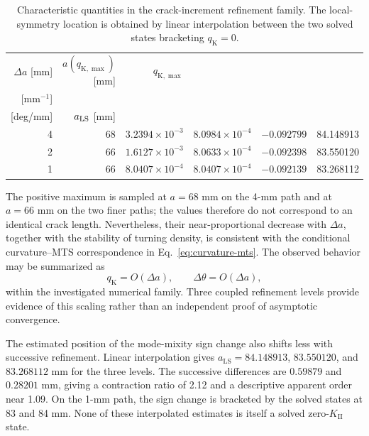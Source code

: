 \documentclass[pdflatex,sn-mathphys-num]{sn-jnl}
\begin{document}
\begin{table}[tbp]
\centering
\small
\setlength{\tabcolsep}{3.6pt}
\caption{Characteristic quantities in the crack-increment refinement
family. The local-symmetry location is obtained by linear interpolation
between the two solved states bracketing $q_{\mathrm{K}}=0$.}
\label{tab:increment-characteristic}
\begin{tabular}{rrrrrr}
\toprule
$\Delta a$ [mm] &
$a(q_{\mathrm{K},\max})$ [mm] &
$q_{\mathrm{K},\max}$ &
\shortstack[c]{$q_{\mathrm{K},\max}/\Delta a$\\{}[mm$^{-1}$]} &
\shortstack[c]{$(\Delta\theta/\Delta a)_{q_{\max}}$\\{}[deg/mm]} &
$a_{\rm LS}$ [mm]\\
\midrule
4 & 68 & $3.2394\times10^{-3}$ & $8.0984\times10^{-4}$ &
$-0.092799$ & 84.148913\\
2 & 66 & $1.6127\times10^{-3}$ & $8.0633\times10^{-4}$ &
$-0.092398$ & 83.550120\\
1 & 66 & $8.0407\times10^{-4}$ & $8.0407\times10^{-4}$ &
$-0.092139$ & 83.268112\\
\bottomrule
\end{tabular}
\end{table}

The positive maximum is sampled at $a=68$ mm on the 4-mm path and
at $a=66$ mm on the two finer paths; the values therefore do not
correspond to an identical crack length. Nevertheless, their
near-proportional decrease with $\Delta a$, together with the
stability of turning density, is consistent with the conditional
curvature--MTS correspondence in Eq.~\eqref{eq:curvature-mts}.
The observed behavior may be summarized as
\begin{equation}
 q_{\mathrm{K}}=O(\Delta a),\qquad
 \Delta\theta=O(\Delta a),
 \label{eq:increment-scaling}
\end{equation}
within the investigated numerical family. Three coupled refinement
levels provide evidence of this scaling rather than an
independent proof of asymptotic convergence.

The estimated position of the mode-mixity sign change
also shifts less with successive refinement. Linear
interpolation gives $a_{\mathrm{LS}}=84.148913$,
$83.550120$, and $83.268112$ mm for the three
levels. The successive differences are $0.59879$
and $0.28201$ mm, giving a contraction ratio of
2.12 and a descriptive apparent order near 1.09.
On the 1-mm path, the sign change is bracketed by
the solved states at 83 and 84 mm. None of these
interpolated estimates is itself a solved
zero-$K_{\mathrm{II}}$ state.
\end{document}
